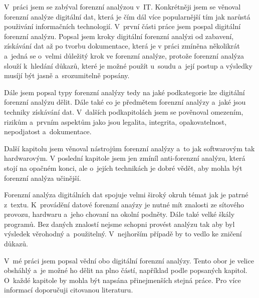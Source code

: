 \documentclass[thesis=B,czech]{FITthesis}[2012/06/26]
\begin{document}
\begin{conclusion}
V~práci jsem se zabýval forenzní analýzou v~IT. Konkrétněji jsem se věnoval forenzní analýze digitální dat, která je čím dál více popularnější tím jak narůstá použivání informačních technologií. V~první části práce jsem pospal digitální forenzní analýzu. Popsal jsem kroky digitální forenzní analýzi od zabavení, získávání dat až po tvorbu dokumentace, která je v práci zmíněna několikrát a~jedná se o~velmi důležitý krok ve forenzní analýze, protože forenzní analýza slouží k~hledání důkazů, které je možné použít u~soudu a~její postup a výsledky musíjí být jasně a~srozumitelně popsány. 

Dále jsem popsal typy forenzní analýzy tedy na jaké podkategorie lze digitální forenzní analýzu dělit. Dále také co je předmětem forenzní analýzy a~jaké jsou techniky získávání dat. V~dalších podkapitolách jsem se pověnoval omezením, rizikům a~prvním aspektům jako jsou legalita, integrita, opakovatelnost, nepodjatost a~dokumentace. 

Další kapitolu jsem věnoval nástrojům forenzní analýzy a~to jak softwarovým tak hardwarovým. V poslední kapitole jsem jen zmíníl anti-forenzní analýzu, která stojí na opačném konci, ale o~jejích technikách je dobré vědět, aby mohla být forenzní analýza učinější. 

Forenzní analýza digitálních dat spojuje velmi široký okruh témat jak je patrné z~textu. K~provádění datové forenzní anaýzy je nutné mít znalosti ze sítového provozu, hardwaru a~jeho chovaní na okolní podněty. Dále také velké škály programů. Bez daných znalostí nejsme schopni provést analýzu tak aby byl výsledek věrohodný a~použitelný. V~nejhorším případě by to vedlo ke zničení důkazů. 

V~mé práci jsem popsal vědní obo digitální forenzní analýzy. Tento obor je velice obsháhlý a~je možné ho dělit na plno částí, například podle popsaných kapitol. O~každé kapitole by mohla být napsána přinejmenších stejná práce. Pro více informací doporučuji citovanou literaturu.


\end{conclusion}




\appendix
\end{document}

